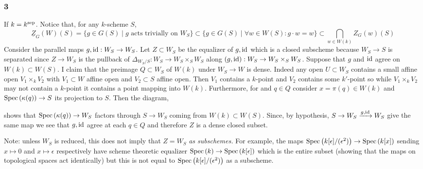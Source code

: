 \documentclass[12pt]{article}
\begin{document}
\subsubsection{3}

If $k = k^{\mathrm{sep}}$. Notice that, for any $k$-scheme $S$,
\[ \underline{Z}_G(W)(S) = \{g \in G(S) \mid  g \text{ acts trivially on } W_S \} \subset \{ g \in G(S) \mid \forall w \in W(S) : g \cdot w = w \} \subset \bigcap_{w \in W(k)} Z_G(w)(S) \]
Consider the parallel maps $g, \mathrm{id} : W_S \to W_S$. Let $Z \subset W_S$ be the equalizer of $g, \mathrm{id}$ which is a closed subscheme because $W_S \to S$ is separated since $Z \to W_S$ is the pullback of $\Delta_{W_S/S} : W_S \to W_S \times_S W_S$ along $(g, \mathrm{id}) : W_S \to W_S \times_S W_S$. Suppose that $g$ and $\mathrm{id}$ agree on $W(k) \subset W(S)$. I claim that the preimage $Q \subset W_S$ of $W(k)$ under $W_S \to W$ is dense. Indeed any open $U \subset W_S$ contains a small affine open $V_1 \times_k V_2$ with $V_1 \subset W$ affine open and $V_2 \subset S$ affine open. Then $V_1$ contains a $k$-point and $V_2$ contains some $k'$-point so while $V_1 \times_k V_2$ may not contain a $k$-point it contains a point mapping into $W(k)$. Furthermore, for and $q \in Q$ consider $x = \pi(q) \in W(k)$ and $\mathrm{Spec}\left( \kappa(q) \right) \to S$ its projection to $S$. Then the diagram,
\begin{center}
\end{center}
shows that $\mathrm{Spec}\left( \kappa(q) \right) \to W_S$ factors through $S \to W_S$ coming from $W(k) \subset W(S)$. Since, by hypothesis, $S \to W_S \xrightarrow{g,\mathrm{id}} W_S$ give the same map we see that $g, \mathrm{id}$ agree at each $q \in Q$ and therefore $Z$ is a dense closed subset.

\begin{rmk}
Note: unless $W_S$ is reduced, this does not imply that $Z = W_S$ \textit{as subschemes.} For example, the maps $\mathrm{Spec}\left( k[\epsilon]/(\epsilon^2) \right) \to \mathrm{Spec}\left( k[x] \right)$ sending $x \mapsto 0$ and $x \mapsto \epsilon$ respectively have scheme theoretic equalizer $\mathrm{Spec}\left( k \right) \to \mathrm{Spec}\left( k[\epsilon] \right)$ which is the entire subset (showing that the maps on topological spaces act identically) but this is not equal to $\mathrm{Spec}\left( k[\epsilon]/(\epsilon^2) \right)$ as a subscheme.
\end{rmk}
\end{document}
